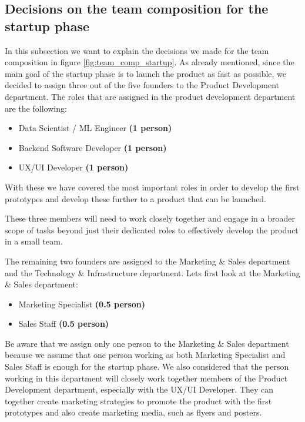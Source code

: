 \subsection{Decisions on the team composition for the startup phase}
\label{sub:decision_on_team_comp_startup}

In this subsection we want to explain the decisions we made for the team composition in figure \ref{fig:team_comp_startup}.
As already mentioned, since the main goal of the startup phase is to launch the product as fast as possible, we decided to assign three out of the five founders to the Product Development department.
The roles that are assigned in the product development department are the following:
\begin{itemize}
    \item Data Scientist / ML Engineer \textbf{(1 person)}
    \item Backend Software Developer \textbf{(1 person)}
    \item UX/UI Developer \textbf{(1 person)}
\end{itemize}
With these we have covered the most important roles in order to develop the first prototypes and develop these further to a product that can be launched.

These three members will need to work closely together and engage in a broader scope of tasks beyond just their dedicated roles to effectively develop the product in a small team.

\p
The remaining two founders are assigned to the Marketing \& Sales department and the Technology \& Infrastructure department.
Lets first look at the Marketing \& Sales department:
\begin{itemize}
    \item Marketing Specialist \textbf{(0.5 person)}
    \item Sales Staff \textbf{(0.5 person)}
\end{itemize}
Be aware that we assign only one person to the Marketing \& Sales department because we assume that one person working as both Marketing Specialist and Sales Staff is enough for the startup phase.
We also considered that the person working in this department will closely work together members of the Product Development department, especially with the UX/UI Developer.
They can together create marketing strategies to promote the product with the first prototypes and also create marketing media, such as flyers and posters.


